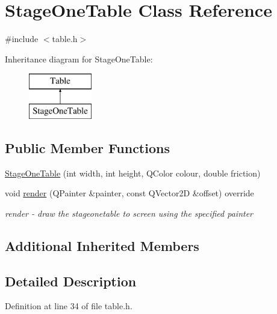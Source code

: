 \hypertarget{class_stage_one_table}{}\section{Stage\+One\+Table Class Reference}
\label{class_stage_one_table}


{\ttfamily \#include $<$table.\+h$>$}

Inheritance diagram for Stage\+One\+Table\+:\begin{figure}[H]
\begin{center}
\leavevmode
\includegraphics[height=2.000000cm]{class_stage_one_table}
\end{center}
\end{figure}
\subsection*{Public Member Functions}
\begin{DoxyCompactItemize}
\item 
\mbox{\hyperlink{class_stage_one_table_ae7bc7a1e4b873759a40039af326b38b9}{Stage\+One\+Table}} (int width, int height, Q\+Color colour, double friction)
\item 
void \mbox{\hyperlink{class_stage_one_table_a1f6dac59ce45c370f94fb3710f744ceb}{render}} (Q\+Painter \&painter, const Q\+Vector2D \&offset) override
\begin{DoxyCompactList}\small\item\em render -\/ draw the stageonetable to screen using the specified painter \end{DoxyCompactList}\end{DoxyCompactItemize}
\subsection*{Additional Inherited Members}


\subsection{Detailed Description}


Definition at line 34 of file table.\+h.



